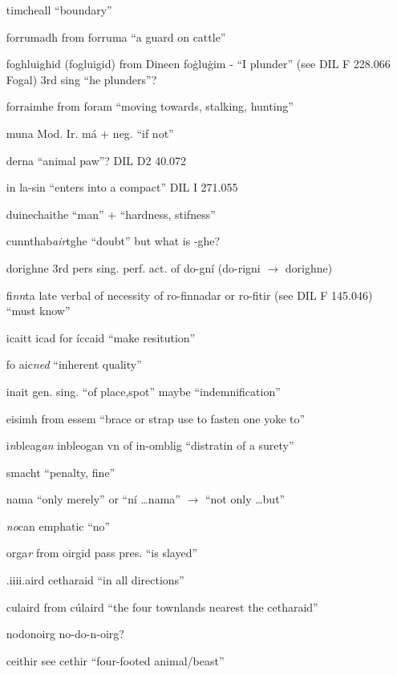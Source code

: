 \documentclass[11pt]{article}
\begin{document}
\begin{enumerate}
  \item[timcheall] \enquote{boundary}
  \item[forrumadh] from forruma \enquote{a guard on cattle} 
  \item[foghluighid] (fogluigid) from Dineen fo\.{g}lu\.{g}im - \enquote{I plunder} (see DIL F 228.066 Fogal) 3rd sing \enquote{he plunders}? 
  \item[forraimhe] from foram \enquote{moving towards, stalking, hunting}
  \item[muna] Mod. Ir. m\'{a} + neg. \enquote{if not}
  \item[derna] \enquote{animal paw}? DIL D2 40.072
  \item[in la-sin] \enquote{enters into a compact} DIL I 271.055
  \item[duinechaithe] \enquote{man} + \enquote{hardness, stifness}
  \item[cunnthab\emph{air}tghe] \enquote{doubt} but what is -ghe? 
  \item[dorighne] 3rd pers sing. perf. act. of do-gn\'{i} (do-rigni $\rightarrow$ dorighne)
  \item[fi\emph{nn}ta] late verbal of necessity of ro-finnadar or ro-fitir (see DIL F 145.046) \enquote{must know}
  \item[icaitt] icad for \'{i}ccaid \enquote{make resitution}
  \item[fo aic\emph{ned}] \enquote{inherent quality}
  \item[inait] gen. sing. \enquote{of place,spot} maybe \enquote{indemnification}
  \item[eisimh] from essem \enquote{brace or strap use to fasten one yoke to}
  \item[i\emph{n}bleag\emph{an}] inbleogan vn of in-omblig \enquote{distratin of a surety}
  \item[smacht] \enquote{penalty, fine}
  \item[nama] \enquote{only merely} or \enquote{n\'{i} \ldots nama} $\rightarrow$ \enquote{not only \ldots but} 
  \item[\emph{no}can] emphatic \enquote{no}
  \item[orga\emph{r}] from oirgid pass pres. \enquote{is slayed}
  \item[.iiii.aird] cetharaid \enquote{in all directions}
  \item[culaird] from c\'{u}laird \enquote{the four townlands nearest the cetharaid}
  \item[nodonoirg] no-do-n-oirg?
  \item[ceithir] see cethir \enquote{four-footed animal/beast}

\end{enumerate}
\end{document}
